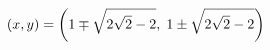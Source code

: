 \documentclass[preview]{standalone}
\begin{document}
\begin{align*}
\special{dvisvgm:raw <g id='unique000'>}(x,y)=\left(1\mp\sqrt{2\sqrt2-2},\;1\pm\sqrt{2\sqrt2-2}\right)\special{dvisvgm:raw </g>}
\end{align*}
\end{document}
